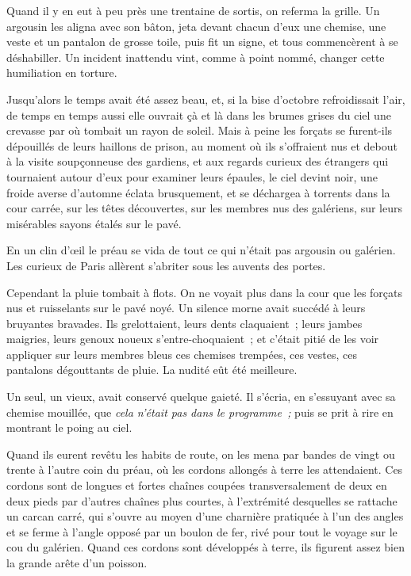 \documentclass[french,twoside]{book} %
\begin{document}
Quand il y en eut à peu près une trentaine de sortis, on referma la grille. Un argousin les aligna avec son bâton, jeta devant chacun d’eux une chemise, une veste et un pantalon de grosse toile, puis fit un signe, et tous commencèrent à se déshabiller. Un incident inattendu vint, comme à point nommé, changer cette humiliation en torture.\par
Jusqu’alors le temps avait été assez beau, et, si la bise d’octobre refroidissait l’air, de temps en temps aussi elle ouvrait çà et là dans les brumes grises du ciel une crevasse par où tombait un rayon de soleil. Mais à peine les forçats se furent-ils dépouillés de leurs haillons de prison, au moment où ils s’offraient nus et debout à la visite soupçonneuse des gardiens, et aux regards curieux des étrangers qui tournaient autour d’eux pour examiner leurs épaules, le ciel devint noir, une froide averse d’automne éclata brusquement, et se déchargea à torrents dans la cour carrée, sur les têtes découvertes, sur les membres nus des galériens, sur leurs misérables sayons étalés sur le pavé.\par
En un clin d’œil le préau se vida de tout ce qui n’était pas argousin ou galérien. Les curieux de Paris allèrent s’abriter sous les auvents des portes.\par
Cependant la pluie tombait à flots. On ne voyait  plus dans la cour que les forçats nus et ruisselants sur le pavé noyé. Un silence morne avait succédé à leurs bruyantes bravades. Ils grelottaient, leurs dents claquaient ; leurs jambes maigries, leurs genoux noueux s’entre-choquaient ; et c’était pitié de les voir appliquer sur leurs membres bleus ces chemises trempées, ces vestes, ces pantalons dégouttants de pluie. La nudité eût été meilleure.\par
Un seul, un vieux, avait conservé quelque gaieté. Il s’écria, en s’essuyant avec sa chemise mouillée, que \emph{cela n’était pas dans le programme ;} puis se prit à rire en montrant le poing au ciel.\par
Quand ils eurent revêtu les habits de route, on les mena par bandes de vingt ou trente à l’autre coin du préau, où les cordons allongés à terre les attendaient. Ces cordons sont de longues et fortes chaînes coupées transversalement de deux en deux pieds par d’autres chaînes plus courtes, à l’extrémité desquelles se rattache un carcan carré, qui s’ouvre au moyen d’une charnière pratiquée à l’un des angles et se ferme à l’angle opposé par un boulon de fer, rivé pour tout le voyage sur le cou du galérien. Quand ces cordons sont développés à terre, ils figurent assez bien la grande arête d’un poisson.\par
\end{document}

